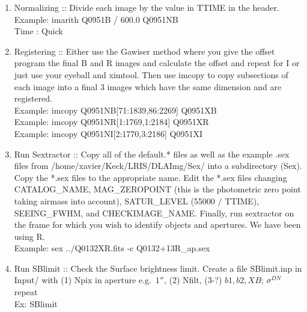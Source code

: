 \documentclass[11pt,letterpaper,dvips]{article}
\begin{document}
\begin{enumerate}
	\begin{enumerate}

	  \item Normalizing :: Divide each image by the value in TTIME in
		the header. \\
         	\quad Example: imarith Q0951B / 600.0  Q0951NB \\
	        \quad Time   : Quick 

	  \item Registering :: Either use the Gawiser method where you give the
		offset program the final B and R images and calculate the
		offset and repeat for I or just use your eyeball and ximtool.  
		Then use imcopy to copy subsections of each image into a 
		final 3 images which have the same dimension and are 
		registered. \\
         	\quad Example: imcopy Q0951NB[71:1839,86:2269] Q0951XB \\
         	\quad Example: imcopy Q0951NR[1:1769,1:2184] Q0951XR \\
         	\quad Example: imcopy Q0951NI[2:1770,3:2186] Q0951XI 


	  \item Run Sextractor :: Copy all of the default.* files 
	  	as well as the example .sex files from
		/home/xavier/Keck/LRIS/DLAImg/Sex/ into a subdirectory (Sex).
		Copy the *.sex files to the appropriate name.  Edit the *.sex
		files changing CATALOG\_NAME, MAG\_ZEROPOINT (this is the
		photometric zero point taking airmass into account), 
		SATUR\_LEVEL (55000 / TTIME), 
		SEEING\_FWHM, and CHECKIMAGE\_NAME. Finally, run sextractor
		on the frame for which you wish to identify objects and
		apertures.  We have been using R.\\
         	\quad Example: sex ../Q0132XR.fits -c Q0132+13R\_ap.sex \\

	  \item Run SBlimit :: Check the Surface brightness limit.  Create
		a file SBlimit.inp in Input/
		with (1) Npix in aperture e.g.\ $1''$,
		(2) Nfilt, (3-?) $b1, b2, XB$; $\sigma^{DN}$ repeat \\
         	\quad Ex: SBlimit


\end{enumerate}
\end{enumerate}
\end{document}
